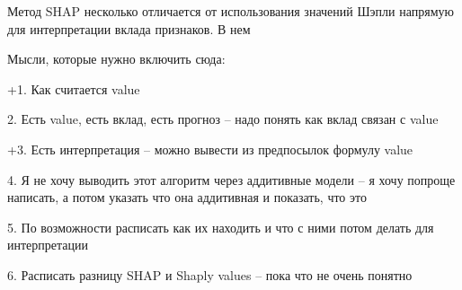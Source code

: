 Метод SHAP несколько отличается от использования значений Шэпли напрямую для интерпретации вклада признаков. В нем

Мысли, которые нужно включить сюда:

+1. Как считается value

2. Есть value, есть вклад, есть прогноз -- надо понять как вклад связан с value

+3. Есть интерпретация -- можно вывести из предпосылок формулу value

4. Я не хочу выводить этот алгоритм через аддитивные модели -- я хочу попроще написать, а потом указать что она аддитивная и показать, что это

5. По возможности расписать как их находить и что с ними потом делать для интерпретации

6. Расписать разницу SHAP и Shaply values -- пока что не очень понятно

